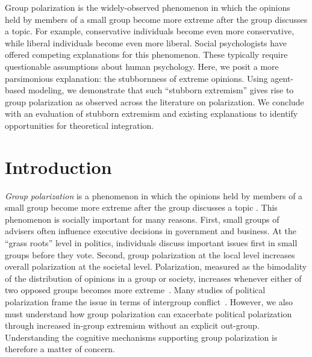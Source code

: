 
Group polarization is the widely-observed phenomenon in which the opinions held by members of a small group become more extreme after the group discusses a topic. 
For example, conservative individuals become even more conservative, while liberal individuals become even more liberal. 
Social psychologists have offered competing explanations for this phenomenon. These typically require questionable assumptions about human psychology. 
Here, we posit a more parsimonious explanation: the stubbornness of extreme opinions. Using agent-based modeling, we demonstrate that such ``stubborn extremism'' 
gives rise to group polarization as observed across the literature on 
polarization.  We conclude with an evaluation of stubborn 
extremism and existing explanations
to identify opportunities for theoretical integration. 



\section{Introduction}
\label{sec:introduction}

\emph{Group polarization} is a phenomenon in which 
the opinions held by members of a small group become more extreme after the group 
discusses a topic \cite{Myers1982,Brown1986,Isenberg1986,Sunstein2002,Sieber2019}.
This phenomenon is socially important for many reasons. First, 
small groups of advisers often influence executive decisions in government and business. 
At the ``grass roots'' level in politics, individuals discuss 
important issues first in small groups before they vote. 
Second, group polarization at the local level increases overall polarization at the societal level. Polarization, measured as the bimodality of the distribution of
opinions in a group or society, increases whenever either of two opposed 
groups becomes more extreme~\cite{Bramson2016}. 
Many studies of political polarization frame the issue in terms of intergroup 
conflict~\cite{Mason2018UncivilAgreementBook,Klein2020}. 
However, we also must understand how
group polarization can exacerbate political polarization through increased
in-group extremism without an explicit out-group. 
Understanding the cognitive mechanisms supporting group 
polarization is therefore a matter of concern. 

